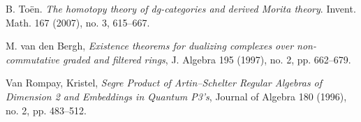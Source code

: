 \documentclass[reqno, 12pt]{amsart}
\begin{document}
\begin{thebibliography}{99}
  B. To\"en. \emph{The homotopy theory of dg-categories and derived Morita theory}. Invent. Math. 167 (2007), no. 3, 615--667. 
  
  M. van den Bergh, \emph{Existence theorems for dualizing complexes over non-commutative graded and filtered rings}, J. Algebra 195 (1997), no. 2, pp. 662--679.

  Van Rompay, Kristel, \emph{Segre Product of Artin--Schelter Regular Algebras of Dimension 2 and Embeddings in Quantum P3's}, Journal of Algebra 180 (1996), no. 2, pp. 483--512.
\end{thebibliography}
\end{document}
